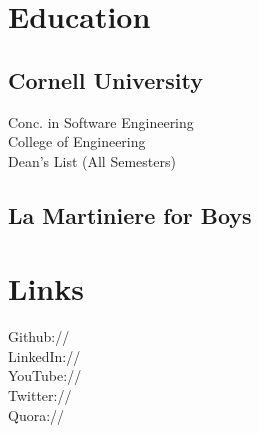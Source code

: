 \documentclass[]{deedy-resume-openfont}
\begin{document}
%
%
\lastupdated

%
%



%
%

\begin{minipage}[t]{0.33\textwidth}


\section{Education}

\subsection{Cornell University}
\sectionsep


Conc. in Software Engineering \\
College of Engineering \\
Dean's List (All Semesters) \\
\sectionsep

\subsection{La Martiniere for Boys}
\sectionsep


\section{Links}
Github:// \href{https://github.com/deedydas}{} \\
LinkedIn://  \href{https://www.linkedin.com/in/debarghyadas}{} \\
YouTube://  \href{https://www.youtube.com/user/DeedyDash007}{} \\
Twitter://  \href{https://twitter.com/debarghya_das}{} \\
Quora://  \href{https://www.quora.com/Debarghya-Das}{}
\sectionsep


\end{minipage}
\end{document}
